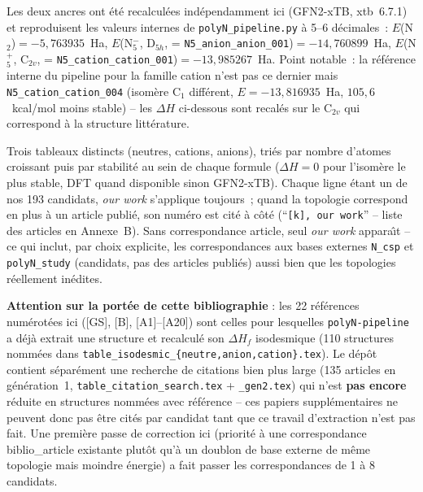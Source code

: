 \documentclass[11pt,a4paper]{article}
\begin{document}
Les deux ancres ont \'et\'e recalcul\'ees ind\'ependamment ici (GFN2-xTB,
xtb~6.7.1) et reproduisent les valeurs internes de
\texttt{polyN\_pipeline.py} \`a 5--6 d\'ecimales~: $E$(N$_2$)$=-5{,}763935$~Ha,
$E$(N$_5^-$, D$_{5h}$, = \texttt{N5\_anion\_anion\_001})$=-14{,}760899$~Ha,
$E$(N$_5^+$, C$_{2v}$, = \texttt{N5\_cation\_cation\_001})$=-13{,}985267$~Ha.
Point notable~: la r\'ef\'erence interne du pipeline pour la famille
cation n'est pas ce dernier mais \texttt{N5\_cation\_cation\_004}
(isom\`ere C$_1$ diff\'erent, $E=-13{,}816935$~Ha, $105{,}6$~kcal/mol moins
stable) -- les $\Delta H$ ci-dessous sont recal\'es sur le C$_{2v}$ qui
correspond \`a la structure litt\'erature.

Trois tableaux distincts (neutres, cations, anions), tri\'es par nombre
d'atomes croissant puis par stabilit\'e au sein de chaque formule
($\Delta H = 0$ pour l'isom\`ere le plus stable, DFT quand disponible sinon
GFN2-xTB). Chaque ligne \'etant un de nos 193 candidats, \emph{our work}
s'applique toujours~; quand la topologie correspond en plus \`a un article
publi\'e, son num\'ero est cit\'e \`a c\^ot\'e (``\texttt{[k], our work}''
-- liste des articles en Annexe~B). Sans correspondance article, seul
\emph{our work} appara\^\i t -- ce qui inclut, par choix explicite, les
correspondances aux bases externes \texttt{N\_csp} et \texttt{polyN\_study}
(candidats, pas des articles publi\'es) aussi bien que les topologies
r\'eellement in\'edites.

\textbf{Attention sur la port\'ee de cette bibliographie} : les 22
r\'ef\'erences num\'erot\'ees ici ([GS], [B], [A1]--[A20]) sont celles pour
lesquelles \texttt{polyN-pipeline} a d\'ej\`a extrait une structure et
recalcul\'e son $\Delta H_f$ isodesmique (110 structures nomm\'ees dans
\texttt{table\_isodesmic\_\{neutre,anion,cation\}.tex}). Le d\'ep\^ot
contient s\'epar\'ement une recherche de citations bien plus large (135
articles en g\'en\'eration~1, \texttt{table\_citation\_search.tex} +
\texttt{\_gen2.tex}) qui n'est \textbf{pas encore} r\'eduite en structures
nomm\'ees avec r\'ef\'erence -- ces papiers suppl\'ementaires ne peuvent
donc pas \^etre cit\'es par candidat tant que ce travail d'extraction n'est
pas fait. Une premi\`ere passe de correction ici (priorit\'e \`a une
correspondance biblio\_article existante plut\^ot qu'\`a un doublon de
base externe de m\^eme topologie mais moindre \'energie) a fait passer
les correspondances de 1 \`a 8 candidats.




\end{document}
